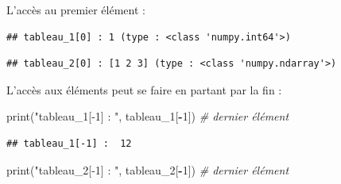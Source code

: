 \documentclass[12pt,]{book}
\newenvironment{Shaded}{\begin{snugshade}}{\end{snugshade}}
\newcommand{\DecValTok}[1]{\textcolor[rgb]{0.00,0.00,0.81}{#1}}
\newcommand{\SpecialCharTok}[1]{\textcolor[rgb]{0.00,0.00,0.00}{#1}}
\newcommand{\StringTok}[1]{\textcolor[rgb]{0.31,0.60,0.02}{#1}}
\newcommand{\CommentTok}[1]{\textcolor[rgb]{0.56,0.35,0.01}{\textit{#1}}}
\newcommand{\OperatorTok}[1]{\textcolor[rgb]{0.81,0.36,0.00}{\textbf{#1}}}
\newcommand{\BuiltInTok}[1]{#1}
\newcommand{\NormalTok}[1]{#1}
\numberwithin{equation}{section}
\numberwithin{countremarque}{section}
\begin{document}
L'accès au premier élément :

\begin{Shaded}
\end{Shaded}

\begin{lstlisting}
## tableau_1[0] : 1 (type : <class 'numpy.int64'>)
\end{lstlisting}

\begin{Shaded}
\end{Shaded}

\begin{lstlisting}
## tableau_2[0] : [1 2 3] (type : <class 'numpy.ndarray'>)
\end{lstlisting}

L'accès aux éléments peut se faire en partant par la fin :

\begin{Shaded}
\begin{Highlighting}[]
\BuiltInTok{print}\NormalTok{(}\StringTok{"tableau_1[-1] : "}\NormalTok{, tableau_1[}\OperatorTok{-}\DecValTok{1}\NormalTok{]) }\CommentTok{# dernier élément}
\end{Highlighting}
\end{Shaded}

\begin{lstlisting}
## tableau_1[-1] :  12
\end{lstlisting}

\begin{Shaded}
\begin{Highlighting}[]
\BuiltInTok{print}\NormalTok{(}\StringTok{"tableau_2[-1] : "}\NormalTok{, tableau_2[}\OperatorTok{-}\DecValTok{1}\NormalTok{]) }\CommentTok{# dernier élément}
\end{Highlighting}
\end{Shaded}
\end{document}
